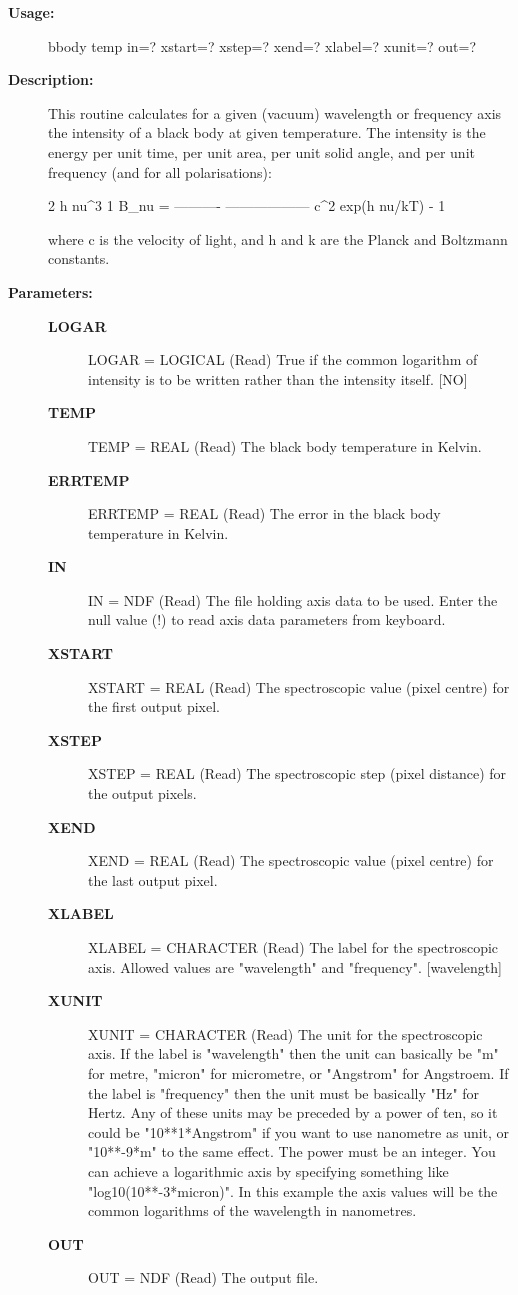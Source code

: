 \begin{description}

\item [{\bf Usage:}]

   bbody temp in=? xstart=? xstep=? xend=? xlabel=? xunit=? out=?


\item [{\bf Description:}]

   This routine calculates for a given (vacuum) wavelength or
   frequency axis the intensity of a black body at given temperature.
   The intensity is the energy per unit time, per unit area, per unit
   solid angle, and per unit frequency (and for all polarisations):

           2 h nu^3          1
   B_nu = ---------- ------------------
              c^2     exp(h nu/kT) - 1

   where c is the velocity of light, and h and k are the
   Planck and Boltzmann constants.

\item [{\bf Parameters:}]
\begin{description}
\item [{\bf LOGAR}]
LOGAR = LOGICAL (Read)
   True if the common logarithm of intensity is to be written
   rather than the intensity itself. [NO]
\item [{\bf TEMP}]
TEMP = REAL (Read)
   The black body temperature in Kelvin.
\item [{\bf ERRTEMP}]
ERRTEMP = REAL (Read)
   The error in the black body temperature in Kelvin.
\item [{\bf IN}]
IN = NDF (Read)
   The file holding axis data to be used. Enter the null value (!)
   to read axis data parameters from keyboard.
\item [{\bf XSTART}]
XSTART = REAL (Read)
   The spectroscopic value (pixel centre) for the first output
   pixel.
\item [{\bf XSTEP}]
XSTEP = REAL (Read)
   The spectroscopic step (pixel distance) for the output pixels.
\item [{\bf XEND}]
XEND = REAL (Read)
   The spectroscopic value (pixel centre) for the last output
   pixel.
\item [{\bf XLABEL}]
XLABEL = CHARACTER (Read)
   The label for the spectroscopic axis. Allowed values are
   "wavelength" and "frequency". [wavelength]
\item [{\bf XUNIT}]
XUNIT = CHARACTER (Read)
   The unit for the spectroscopic axis.
   If the label is "wavelength" then the unit can basically be "m"
   for metre, "micron" for micrometre, or "Angstrom" for
   Angstroem. If the label is "frequency" then the unit must be
   basically "Hz" for Hertz.
   Any of these units may be preceded by a power of ten, so it
   could be "10**1*Angstrom" if you want to use nanometre as unit,
   or "10**-9*m" to the same effect. The power must be an
   integer.
   You can achieve a logarithmic axis by specifying something like
   "log10(10**-3*micron)". In this example the axis values will be
   the common logarithms of the wavelength in nanometres.
\item [{\bf OUT}]
OUT = NDF (Read)
   The output file.
\end{description}


\end{description}
